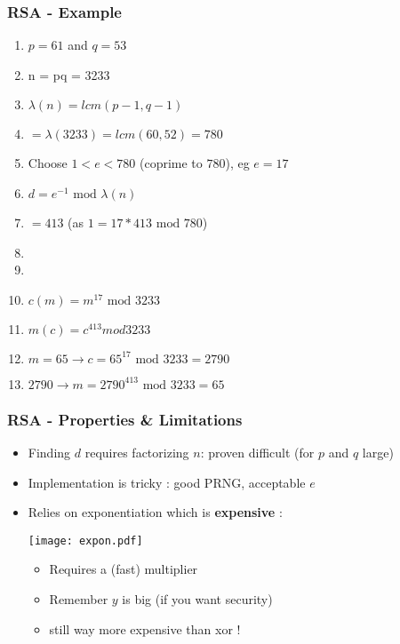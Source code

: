 \documentclass[
hyperref={pdfpagelabels=false}
,xcolor=table
]
{beamer}
\newcommand{\plus}{{\texttt{[image: plus.png]}}}
\newcommand{\minus}{{\texttt{[image: minus.png]}}}
\begin{document}


  

\begin{frame}
  \frametitle{RSA - Example}
  \begin{enumerate}
  \item $p = 61$ and $q = 53$
  \item n = pq = 3233
  \item $\lambda(n) = lcm(p-1, q-1)$
  \item $= \lambda(3233) = lcm(60,52) = 780$
  \item Choose $1<e<780$ (coprime to $780$), eg $e=17$
  \item $d = e^{-1} \mbox{ mod } \lambda(n)$
  \item $= 413$ (as $1 = 17 * 413 \mbox{ mod } 780$)
  \item {}
  \item {}
  \item $c(m) = m^{17} \mbox { mod } 3233$
  \item $m(c) = c^{413} mod 3233$
  \item $m = 65 \rightarrow c = 65^{17} \mbox{ mod } 3233 = 2790$
  \item $2790 \rightarrow m = 2790^{413} \mbox{ mod } 3233 = 65$
  \end{enumerate}
  
\end{frame}

\begin{frame}
  \frametitle{RSA - Properties \& Limitations}

  \begin{itemize}
  \item[\plus] Finding $d$ requires factorizing $n$: proven difficult (for $p$ and $q$ large)
  \item[\minus] Implementation is tricky : good PRNG, acceptable $e$ 
  \item[\minus] Relies on exponentiation which is \textbf{expensive} :
    \begin{center}
      \texttt{[image: expon.pdf]}
    \end{center}
    \begin{itemize}
    \item Requires a (fast) multiplier
    \item Remember $y$ is big (if you want security)
    \item still way more expensive than xor ! 
    \end{itemize}
  \end{itemize}
\end{frame}
\end{document}
